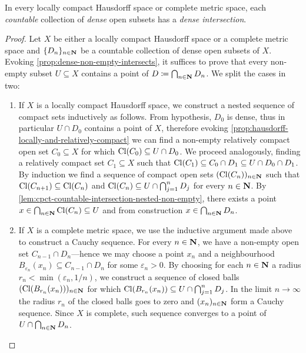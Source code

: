 \begin{theorem}
    \label{thm:baire-category}
    In every locally compact Hausdorff space or complete metric space, each
    \emph{countable} collection of \emph{dense} open subsets has a \emph{dense
        intersection}.
\end{theorem}

\begin{proof}
    Let \(X\) be either a locally compact Hausdorff space or a complete metric space
    and \(\{D_n\}_{n \in \mathbf{N}}\) be a countable collection of dense open subsets of
    \(X\). Evoking \cref{prop:dense-non-empty-intersects}, it suffices to prove that
    every non-empty subset \(U \subseteq X\) contains a point of
    \(D \coloneq \bigcap_{n \in \mathbf{N}} D_n\). We split the cases in two:
    \begin{enumerate}\setlength\itemsep{0em}
        \item If \(X\) is a locally compact Hausdorff space, we construct a nested
              sequence of compact sets inductively as follows. From hypothesis, \(D_0\) is
              dense, thus in particular \(U \cap D_0\) contains a point of \(X\), therefore
              evoking \cref{prop:hausdorff-locally-and-relatively-compact} we can find a
              non-empty relatively compact open set \(C_0 \subseteq X\) for which
              \(\operatorname{Cl}(C_0) \subseteq U \cap D_0\). We proceed analogously, finding a
              relatively compact set \(C_1 \subseteq X\) such that
              \(\operatorname{Cl}(C_1) \subseteq C_0 \cap D_1 \subseteq U \cap D_0 \cap D_1\). By
              induction we find a sequence of compact open sets \((\operatorname{Cl}(C_n))_{n \in \mathbf{N}}\)
              such that \(\operatorname{Cl}(C_{n+1}) \subseteq \operatorname{Cl}(C_{n})\) and
              \(\operatorname{Cl}(C_n) \subseteq U \cap \bigcap_{j=1}^n D_j\) for every \(n \in \mathbf{N}\). By
              \cref{lem:cpct-countable-intersection-nested-non-empty}, there exists a point
              \(x \in \bigcap_{n \in \mathbf{N}} \operatorname{Cl}(C_n) \subseteq U\) and from construction
              \(x \in \bigcap_{n \in \mathbf{N}} D_n\).

        \item If \(X\) is a complete metric space, we use the inductive argument made
              above to construct a Cauchy sequence. For every \(n \in \mathbf{N}\), we have a
              non-empty open set \(C_{n-1} \cap D_n\)---hence we may choose a point
              \(x_n\) and a neighbourhood
              \(B_{\varepsilon_n}(x_n) \subseteq C_{n-1} \cap D_n\) for some
              \(\varepsilon_n > 0\). By choosing for each \(n \in \mathbf{N}\) a radius
              \(r_n < \min(\varepsilon_n, 1/n)\), we construct a sequence of closed balls
              \((\operatorname{Cl}(B_{r_n}(x_n)))_{n \in \mathbf{N}}\) for which
              \(\operatorname{Cl}(B_{r_n}(x_n)) \subseteq U \cap \bigcap_{j=1}^n D_j\). In the limit
              \(n \to \infty\) the radius \(r_n\) of the closed balls goes to zero and
              \((x_n)_{n \in \mathbf{N}}\) form a Cauchy sequence. Since \(X\) is complete, such
              sequence converges to a point of \(U \cap \bigcap_{n \in \mathbf{N}} D_n\).
    \end{enumerate}
\end{proof}

